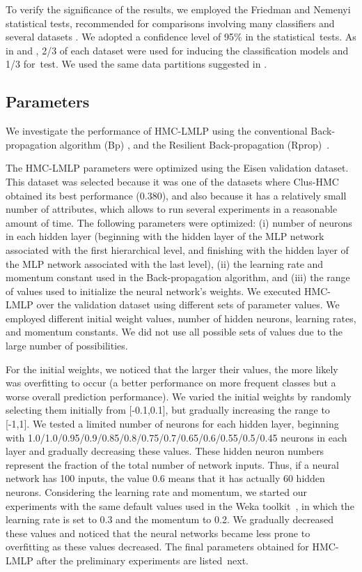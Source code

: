To verify the significance of the results, we employed the Friedman and Nemenyi statistical tests, recommended for comparisons involving many classifiers and several datasets \cite{Demsar2006}. We adopted a confidence level of 95\% in the statistical~tests. As in \cite{Vens2008} and \cite{Otero2010}, 2/3 of each dataset were used for inducing the classification models and 1/3 for~test. We used the same data partitions suggested in \cite{Vens2008}.

\subsection{Parameters}

We investigate the performance of HMC-LMLP using the conventional Back-propagation algorithm (Bp) \cite{Rumelhart1986}, and the Resilient Back-propagation (Rprop)~\cite{Riedmiller1993}.

The HMC-LMLP parameters were optimized using the Eisen validation dataset. This dataset was selected because it was one of the datasets where Clus-HMC obtained its best performance (0.380), and also because it has a relatively small number of attributes, which allows to run several experiments in a reasonable amount of time. The following parameters were optimized: (i) number of neurons in each hidden layer (beginning with the hidden layer of the MLP network associated with the first hierarchical level, and finishing with the hidden layer of the MLP network associated with the last level), (ii) the learning rate and momentum constant used in the Back-propagation algorithm, and (iii) the range of values used to initialize the neural network's weights. %
We executed HMC-LMLP over the validation dataset using different sets of parameter values. We employed different initial weight values, number of hidden neurons, learning rates, and momentum constants. We did not use all possible sets of values due to the large number of possibilities.

\sloppy
For the initial weights, we noticed that the larger their values, the more likely was overfitting to occur (a better performance on more frequent classes but a worse overall prediction performance). We varied the initial weights by randomly selecting them initially from [-0.1,0.1], but gradually increasing the range to [-1,1]. We tested a limited number of neurons for each hidden layer, beginning with 1.0/1.0/0.95/0.9/0.85/0.8/0.75/0.7/0.65/0.6/0.55/0.5/0.45 neurons in each layer and gradually decreasing these values. These hidden neuron numbers represent the fraction of the total number of network inputs. Thus, if a neural network has 100 inputs, the value 0.6 means that it has actually 60 hidden neurons. Considering the learning rate and momentum, we started our experiments with the same default values used in the Weka toolkit~\cite{Weka}, in which the learning rate is set to 0.3 and the momentum to 0.2. We gradually decreased these values and noticed that the neural networks became less prone to overfitting as these values decreased. The final parameters obtained for HMC-LMLP after the preliminary experiments are listed~next.

